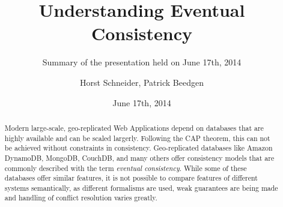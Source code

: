 \documentclass{scrartcl}
\title{Understanding Eventual Consistency}
\subtitle{Summary of the presentation held on June 17th, 2014}
\author{Horst Schneider, Patrick Beedgen}
\date{June 17th, 2014}
\begin{document}
 
\maketitle

\begin{abstract}
Modern large-scale, geo-replicated Web Applications depend on databases that are highly available and can be scaled largerly. Following the CAP theorem, this can not be achieved without constraints in consistency. Geo-replicated databases like Amazon DynamoDB, MongoDB, CouchDB, and many others offer consistency models that are commonly described with the term \textit{eventual consistency}. While some of these databases offer similar features, it is not possible to compare features of different systems semantically, as different formalisms are used, weak guarantees are being made and handling of conflict resolution varies greatly. 


\end{abstract}
\end{document}

